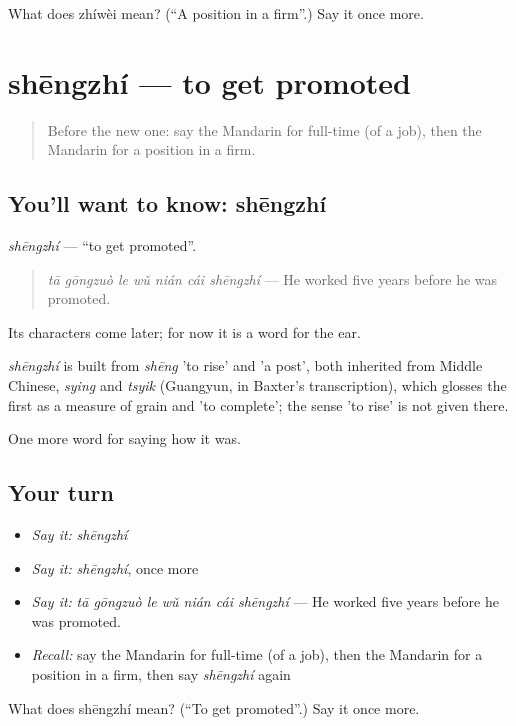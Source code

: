\begin{tcolorbox}[breakable,colback=teal!4,colframe=teal!35!black,title={Before you move on}]
What does zhíwèi mean? (\textquotedblleft{}A position in a firm\textquotedblright{}.) Say it once more.
\end{tcolorbox}
\section[shēngzhí]{shēngzhí — to get promoted}

\label{lesson:ZH-C489-shengzhi}



\begin{quote}
Before the new one: say the Mandarin for full-time (of a job), then the Mandarin for a position in a firm.
\end{quote}

\subsection*{You'll want to know: shēngzhí}
\emph{shēngzhí} — \textquotedblleft{}to get promoted\textquotedblright{}.

\begin{quote}
\emph{tā gōngzuò le wǔ nián cái shēngzhí} — He worked five years before he was promoted.
\end{quote}

Its characters come later; for now it is a word for the ear.

\begin{cousinweb}
\emph{shēngzhí} is built from \emph{shēng} 'to rise' and  'a post', both inherited from Middle Chinese, \emph{sying} and \emph{tsyik} (Guangyun, in Baxter's transcription), which glosses the first as a measure of grain and 'to complete'; the sense 'to rise' is not given there.
\end{cousinweb}

\begin{grammarlens}[title={What you've built}]
One more word for saying how it was.
\end{grammarlens}

\subsection*{Your turn}
\begin{itemize}
\raggedright
  \item \emph{Say it:} \emph{shēngzhí}
  \item \emph{Say it:} \emph{shēngzhí}, once more
  \item \emph{Say it:} \emph{tā gōngzuò le wǔ nián cái shēngzhí} — He worked five years before he was promoted.
  \item \emph{Recall:} say the Mandarin for full-time (of a job), then the Mandarin for a position in a firm, then say \emph{shēngzhí} again
\end{itemize}

\begin{tcolorbox}[breakable,colback=teal!4,colframe=teal!35!black,title={Before you move on}]
What does shēngzhí mean? (\textquotedblleft{}To get promoted\textquotedblright{}.) Say it once more.
\end{tcolorbox}
